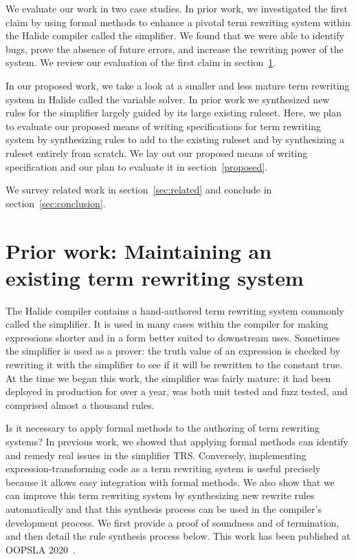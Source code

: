 We evaluate our work in two case studies. In prior work, we investigated the first claim by using formal methods to enhance a pivotal term rewriting system within the Halide compiler called the simplifier. We found that we were able to identify bugs, prove the absence of future errors, and increase the rewriting power of the system. We review our evaluation of the first claim in section~\ref{sec:prior}. 

In our proposed work, we take a look at a smaller and less mature term rewriting system in Halide called the variable solver. In prior work we synthesized new rules for the simplifier largely guided by its large existing ruleset. Here, we plan to evaluate our proposed means of writing specifications for term rewriting system by synthesizing rules to add to the existing ruleset and by synthesizing a ruleset entirely from scratch. We lay out our proposed means of writing specification and our plan to evaluate it in section~\ref{proposed}.

We survey related work in section~\ref{sec:related} and conclude in section~\ref{sec:conclusion}.

\section{Prior work: Maintaining an existing term rewriting system}
\label{sec:prior}

The Halide compiler contains a hand-authored term rewriting system commonly called the simplifier. It is used in many cases within the compiler for making expressions shorter and in a form better suited to downstream uses. Sometimes the simplifier is used as a prover: the truth value of an expression is checked by rewriting it with the simplifier to see if it will be rewritten to the constant true. At the time we began this work, the simplifier was fairly mature: it had been deployed in production for over a year, was both unit tested and fuzz tested, and comprised almost a thousand rules.

Is it necessary to apply formal methods to the authoring of term rewriting systems? In previous work, we showed that applying formal methods can identify and remedy real issues in the simplifier TRS. Conversely, implementing expression-transforming code as a term rewriting system is useful precisely because it allows easy integration with formal methods. We also show that we can improve this term rewriting system by synthesizing new rewrite rules automatically and that this synthesis process can be used in the compiler's development process. We first provide a proof of soundness and of termination, and then detail the rule synthesis process below. This work has been published at OOPSLA 2020~\cite{newcomb2020verifying}.

